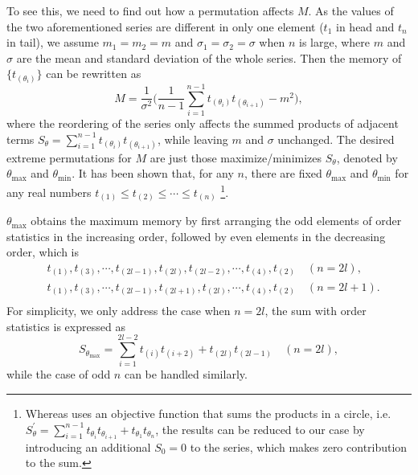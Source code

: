 To see this, we need to find out how a permutation affects $ M $. 
As the values of the two aforementioned series are different in only one element ($ t_{1} $ in head and $ t_{n} $ in tail), we assume $ m_{1} = m_{2} = m$ and
$ \sigma_{1} = \sigma_{2} = \sigma $ when $ n $ is large, where $ m $ and $ \sigma $ are the mean and standard deviation of the whole series. Then the memory  of $ \{t_{(\theta_i)}\} $ can be rewritten as
\begin{equation}
	M = \frac{1}{\sigma^2} \big( \frac{1}{n-1} \sum_{i=1}^{n-1} t_{(\theta_i)}t_{(\theta_{i+1})} - m^2 \big), \label{eqs:MSimple}
\end{equation} 
where the reordering of the series only affects the summed products of adjacent terms $ S_{\theta} = \sum_{i=1}^{n-1} t_{(\theta_i)} t_{(\theta_{i+1})} $, while leaving $ m $ and $ \sigma $ unchanged. The desired extreme permutations for $ M $ are just those maximize/minimizes $ S_{\theta} $, denoted by $ \theta_{\max} $ and $ \theta_{\min} $. It has been shown that, for any $ n $,  there are fixed $ \theta_{\max} $ and $ \theta_{\min} $ for any real numbers $ t_{(1)} \leq t_{(2)} \leq \cdots \leq t_{(n)} $ \cite{Hallin1992} \footnote{Whereas \cite{Hallin1992} uses an objective function that sums the products in a circle, i.e. $S^{\prime}_{\theta} = \sum_{i=1}^{n-1} t_{\theta_{i}} t_{\theta_{i+1}} + t_{\theta_{1}} t_{\theta_{n}}$, the results can be reduced to our case by introducing an additional $ S_0 = 0 $ to the series, which makes zero contribution to the sum.}.

$ \theta_{\max} $ obtains the maximum memory by first arranging the odd elements of order statistics in the increasing order, followed by even elements in the decreasing order, which is
\begin{equation}
\begin{split}
&t_{(1)}, t_{(3)}, \cdots, t_{(2l-1)}, t_{(2l)}, t_{(2l-2)}, \cdots, t_{(4)}, t_{(2)} \quad (n=2l), \\
&t_{(1)}, t_{(3)}, \cdots, t_{(2l-1)}, t_{(2l+1)}, t_{(2l)}, \cdots, t_{(4)}, t_{(2)} \quad (n=2l+1). \\
\end{split} \label{eqs:maxArrange}
\end{equation} 
For simplicity, we only address the case when $ n=2l $, the sum with order statistics is expressed as 
\begin{equation}
	S_{\theta_{\max}} = \sum_{i=1}^{2l-2} t_{(i)}t_{(i+2)} + t_{(2l)}t_{(2l-1)} \quad (n=2l), \label{eqs:Smax}
\end{equation}
while the case of odd $ n $ can be handled similarly.



